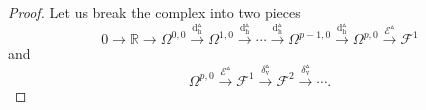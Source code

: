 \documentclass[11pt]{article} %
\numberwithin{equation}{section}
\newcommand{\upd}{\operatorname{d}}
\newcommand{\uph}{\operatorname{h}}
\newcommand{\upv}{\operatorname{v}}
\newcommand{\mcE}{\mathcal{E}}
\newcommand{\dDh}{\upd^{\vartriangle}_{\uph}}
\theoremstyle{plain}
\theoremstyle{definition}
\begin{document}
\begin{proof}

Let us break the complex into two pieces
\begin{equation}
0\rightarrow\mathbb{R}\rightarrow
\Omega^{0,0}\stackrel{\dDh}{\longrightarrow}
\Omega^{1,0}\stackrel{\dDh}{\longrightarrow}
\cdots\stackrel{\dDh}{\longrightarrow}
\Omega^{p-1,0}\stackrel{\dDh}{\longrightarrow}
\Omega^{p,0}\stackrel{\mcE^{\vartriangle}}{\longrightarrow}
\mathscr{F}^1 
\end{equation}
and
\begin{equation}
\Omega^{p,0}\stackrel{\mcE^{\vartriangle}}{\longrightarrow}
\mathscr{F}^1\stackrel{\delta^{\vartriangle}_{\upv}}{\longrightarrow}
\mathscr{F}^2\stackrel{\delta^{\vartriangle}_{\upv}}{\longrightarrow}
\cdots. 
\end{equation}


\end{proof}
\end{document}
